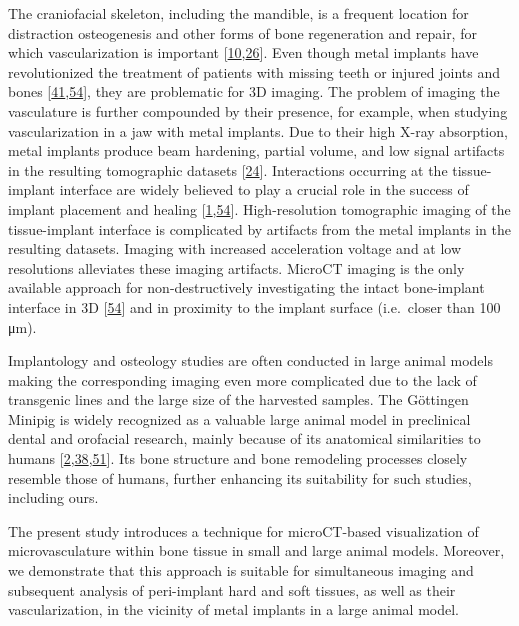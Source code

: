 The craniofacial skeleton, including the mandible, is a frequent location for distraction osteogenesis and other forms of bone regeneration and repair, for which vascularization is important {[}\protect\hyperlink{ref-yZTJBX1B}{10},\protect\hyperlink{ref-18wESlA6d}{26}{]}.
Even though metal implants have revolutionized the treatment of patients with missing teeth or injured joints and bones {[}\protect\hyperlink{ref-rCXuqa0O}{41},\protect\hyperlink{ref-11349lK8v}{54}{]}, they are problematic for 3D imaging.
The problem of imaging the vasculature is further compounded by their presence, for example, when studying vascularization in a jaw with metal implants.
Due to their high X-ray absorption, metal implants produce beam hardening, partial volume, and low signal artifacts in the resulting tomographic datasets {[}\protect\hyperlink{ref-X5Wzek9s}{24}{]}.
Interactions occurring at the tissue-implant interface are widely believed to play a crucial role in the success of implant placement and healing {[}\protect\hyperlink{ref-137VU0bph}{1},\protect\hyperlink{ref-11349lK8v}{54}{]}.
High-resolution tomographic imaging of the tissue-implant interface is complicated by artifacts from the metal implants in the resulting datasets.
Imaging with increased acceleration voltage and at low resolutions alleviates these imaging artifacts.
MicroCT imaging is the only available approach for non-destructively investigating the intact bone-implant interface in 3D {[}\protect\hyperlink{ref-11349lK8v}{54}{]} and in proximity to the implant surface (i.e.~closer than 100 μm).

Implantology and osteology studies are often conducted in large animal models making the corresponding imaging even more complicated due to the lack of transgenic lines and the large size of the harvested samples.
The Göttingen Minipig is widely recognized as a valuable large animal model in preclinical dental and orofacial research, mainly because of its anatomical similarities to humans {[}\protect\hyperlink{ref-1EXdAADA3}{2},\protect\hyperlink{ref-i45b7Cmp}{38},\protect\hyperlink{ref-Siy9vGW7}{51}{]}.
Its bone structure and bone remodeling processes closely resemble those of humans, further enhancing its suitability for such studies, including ours.

The present study introduces a technique for microCT-based visualization of microvasculature within bone tissue in small and large animal models.
Moreover, we demonstrate that this approach is suitable for simultaneous imaging and subsequent analysis of peri-implant hard and soft tissues, as well as their vascularization, in the vicinity of metal implants in a large animal model.

